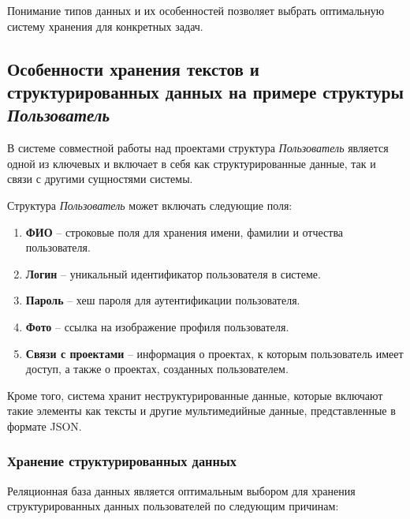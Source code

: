 Понимание типов данных и их особенностей позволяет выбрать оптимальную систему хранения для конкретных задач.

\subsection{Особенности хранения текстов и структурированных данных на примере структуры \textit{Пользователь}}

В системе совместной работы над проектами структура \textit{Пользователь} является одной из ключевых и включает в себя как структурированные данные, так и связи с другими сущностями системы.

Структура \textit{Пользователь} может включать следующие поля:

\begin{enumerate}[wide=12.6mm, leftmargin=12.6mm]
    \item \textbf{ФИО} -- строковые поля для хранения имени, фамилии и отчества пользователя.
    \item \textbf{Логин} -- уникальный идентификатор пользователя в системе.
    \item \textbf{Пароль} -- хеш пароля для аутентификации пользователя.
    \item \textbf{Фото} -- ссылка на изображение профиля пользователя.
    \item \textbf{Связи с проектами} -- информация о проектах, к которым пользователь имеет доступ, а также о проектах, созданных пользователем.
\end{enumerate}

Кроме того, система хранит неструктурированные данные, которые включают такие элементы как тексты и другие мультимедийные данные, представленные в формате JSON.

\subsubsection{Хранение структурированных данных}

Реляционная база данных является оптимальным выбором для хранения структурированных данных пользователей по следующим причинам:

